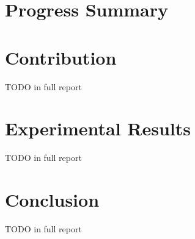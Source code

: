 \documentclass[12pt,twoside]{report}
\begin{document}
\chapter{Progress Summary}  %

%
%


\chapter{Contribution} TODO in full report


\chapter{Experimental Results} TODO in full report


\chapter{Conclusion} TODO in full report


{}
%
\newpage
{} 


\end{document}
